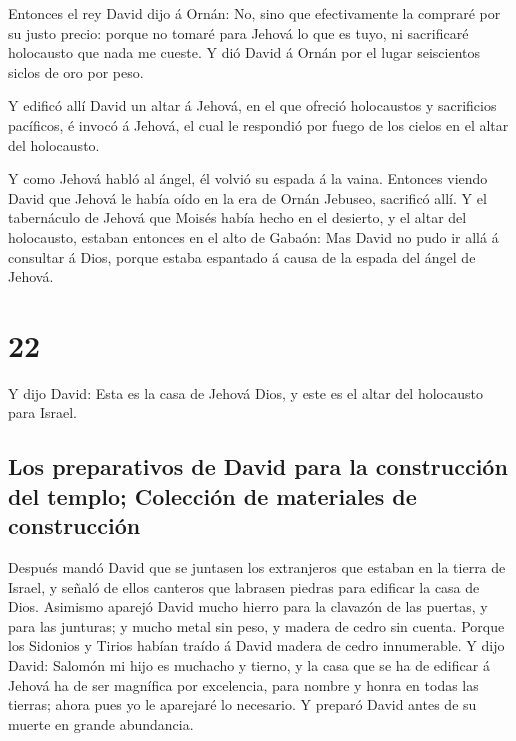  Entonces el rey David dijo á Ornán: No, sino que
efectivamente la compraré por su justo precio: porque no tomaré para
Jehová lo que es tuyo, ni sacrificaré holocausto que nada me cueste.
 Y dió David á Ornán por el lugar seiscientos siclos de
oro por peso.

 Y edificó allí David un altar á Jehová, en el que
ofreció holocaustos y sacrificios pacíficos, é invocó á Jehová, el cual
le respondió por fuego de los cielos en el altar del holocausto.

 Y como Jehová habló al ángel, él volvió su espada á la
vaina.  Entonces viendo David que Jehová le había oído en
la era de Ornán Jebuseo, sacrificó allí.  Y el
tabernáculo de Jehová que Moisés había hecho en el desierto, y el altar
del holocausto, estaban entonces en el alto de Gabaón: Mas David no pudo
ir allá á consultar á Dios, porque estaba espantado á causa de la espada
del ángel de Jehová.

\hypertarget{section-13-22}{%
\section{22}\label{section-13-22}}

 Y dijo David: Esta es la casa de Jehová Dios, y este es
el altar del holocausto para Israel.

\hypertarget{los-preparativos-de-david-para-la-construcciuxf3n-del-templo-colecciuxf3n-de-materiales-de-construcciuxf3n}{%
\subsection{Los preparativos de David para la construcción del templo;
Colección de materiales de
construcción}\label{los-preparativos-de-david-para-la-construcciuxf3n-del-templo-colecciuxf3n-de-materiales-de-construcciuxf3n}}

 Después mandó David que se juntasen los extranjeros que
estaban en la tierra de Israel, y señaló de ellos canteros que labrasen
piedras para edificar la casa de Dios.  Asimismo aparejó
David mucho hierro para la clavazón de las puertas, y para las junturas;
y mucho metal sin peso, y madera de cedro sin cuenta. 
Porque los Sidonios y Tirios habían traído á David madera de cedro
innumerable.  Y dijo David: Salomón mi hijo es muchacho y
tierno, y la casa que se ha de edificar á Jehová ha de ser magnífica por
excelencia, para nombre y honra en todas las tierras; ahora pues yo le
aparejaré lo necesario. Y preparó David antes de su muerte en grande
abundancia.

